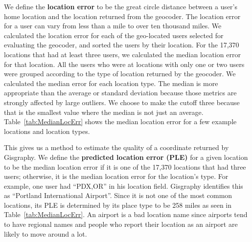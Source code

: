 We define the \textbf{location error} to be the great circle distance between a
user's home location and the location returned from the geocoder.
%
The location error for a user can vary from less than a mile to over ten
thousand miles.
%
We calculated the location error for each of the geo-located users selected for
evaluating the geocoder, and sorted the users by their location.
%
For the 17,370 locations that had at least three users, we calculated the median
location error for that location.
%
All the users who were at locations with only one or two users were grouped
according to the type of location returned by the geocoder.
%
We calculated the median error for each location type.
%
The median is more appropriate than the average or standard deviation because
those metrics are strongly affected by large outliers.
%
We choose to make the cutoff three because that is the smallest value where the
median is not just an average.
Table~\ref{tab:MedianLocErr} shows the median location error for a few example
locations and location types.

This gives us a method to estimate the quality of a coordinate returned by
Gisgraphy.
%
We define the \textbf{predicted location error (PLE)} for a given location to
be the median location error if it is one of the 17,370 locations that had
three users; otherwise, it is the median location error for the location's
type.
%
For example, one user had ``PDX,OR'' in his location field.
%
Gisgraphy identifies this as ``Portland International Airport''.
%
Since it is not one of the most common locations, its PLE is determined by its
place type to be 258 miles as seen in Table~\ref{tab:MedianLocErr}.
%
An airport is a bad location name since airports tend to have regional names
and people who report their location as an airport are likely to move around a
lot.

